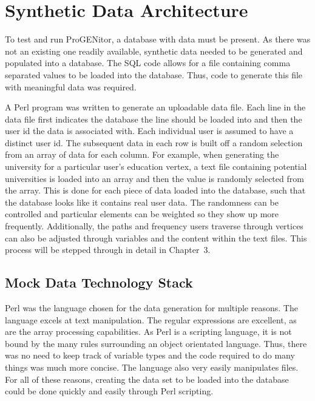 \section{Synthetic Data Architecture}
	To test and run ProGENitor, a database with data must be present.  As there was
not an existing one readily available, synthetic data needed to be generated and
populated into a database.  The SQL code allows for a file containing comma
separated values to be loaded into the database.  Thus, code to generate this
file with meaningful data was required.  
	
A Perl program was written to generate an uploadable data file.  Each line in
the data file first indicates the database the line should be loaded into and
then the user id the data is associated with.  Each individual user is assumed
to have a distinct user id.  The subsequent data in each row is built off a
random selection from an array of data for each column.  For example, when
generating the university for a particular user's education vertex, a text file
containing potential universities is loaded into an array and then the value is
randomly selected from the array.  This is done for each piece of data loaded
into the database, such  that the database looks like it contains real user
data.  The randomness can be controlled and particular elements can be weighted
so they show up more frequently.  Additionally, the paths and frequency users
traverse through vertices can also be adjusted through variables and the content
within the text files.  This process will be stepped through in detail in
Chapter~3.

\subsection{Mock Data Technology Stack}
Perl was the language chosen for the data generation for multiple reasons.  The
language excels at text manipulation.  The regular expressions are excellent, as
are the array processing capabilities.  As Perl is a scripting language, it is
not bound by the many rules surrounding an object orientated language.  Thus,
there was no need to keep track of variable types and the code required to do
many things was much more concise.  The language also very easily manipulates
files.  For all of these reasons, creating the data set to be loaded into the
database could be done quickly and easily through Perl scripting.
